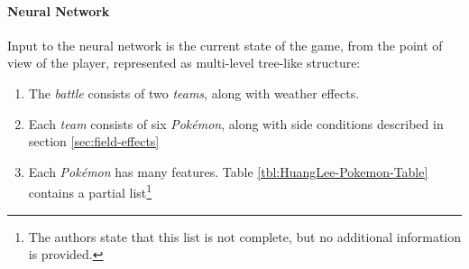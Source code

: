 \paragraph{Neural Network}
Input to the neural network is the current state of the game, from the point of view of the player,
represented as multi-level tree-like structure:
\begin{enumerate}
    \item The \textit{battle} consists of two \textit{teams}, along with weather effects.
    \item Each \textit{team} consists of six \textit{Pokémon}, along with side conditions 
    described in section \ref{sec:field-effects}
    \item Each \textit{Pokémon} has many features. Table \ref{tbl:HuangLee-Pokemon-Table} contains a partial 
    list\footnote{The authors state that this list is not complete, but no additional information is provided.}
\end{enumerate}
